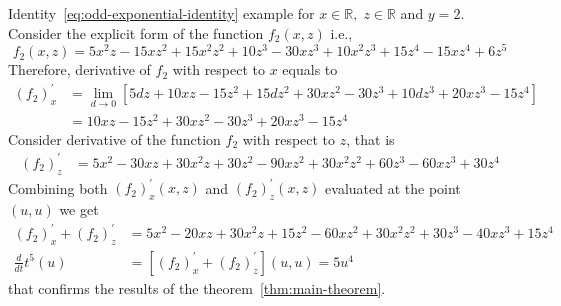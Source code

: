 \begin{example}
    \normalfont
    Identity~\eqref{eq:odd-exponential-identity} example for $x\in\mathbb{R}, \; z\in \mathbb{R}$ and $y=2$.
    Consider the explicit form of the function $f_{2} (x, z)$ i.e.,
    \[
        f_2 (x, z) = 5 x^2 z - 15 x z^2 + 15 x^2 z^2 + 10 z^3 - 30 x z^3 + 10 x^2 z^3 + 15 z^4 - 15 x z^4 + 6 z^5
    \]
    Therefore, derivative of $f_{2}$ with respect to $x$ equals to
    \begin{align*}
    (f_2)
        ^{'}_{x} &= \lim_{d \to 0} \left[ 5 d z + 10 x z - 15 z^2 + 15 d z^2 + 30 x z^2 - 30 z^3 + 10 d z^3 +
        20 x z^3 - 15 z^4 \right] \\
        &= 10 x z - 15 z^2 + 30 x z^2 - 30 z^3 + 20 x z^3 - 15 z^4
    \end{align*}
    Consider derivative of the function $f_2$ with respect to $z$, that is
    \begin{align*}
    (f_2)
        ^{'}_{z}
        &= 5 x^2 - 30 x z + 30 x^2 z + 30 z^2 - 90 x z^2 + 30 x^2 z^2 + 60 z^3 - 60 x z^3 + 30 z^4
    \end{align*}
    Combining both $(f_2)^{'}_{x} (x, z)$ and $(f_2)^{'}_{z} (x, z)$ evaluated at the point $(u, u)$ we get
    \begin{align*}
    (f_2)
        ^{'}_{x} + (f_2)^{'}_{z} &= 5 x^2 - 20 x z + 30 x^2 z + 15 z^2 - 60 x z^2 + 30 x^2 z^2 + 30 z^3 - 40 x z^3 + 15 z^4\\
        \frac{d}{dt} t^{5} (u) &= [(f_2)^{'}_{x} + (f_2)^{'}_{z}] (u,u) = 5 u^4
    \end{align*}
    that confirms the results of the theorem~\ref{thm:main-theorem}.
\end{example}
